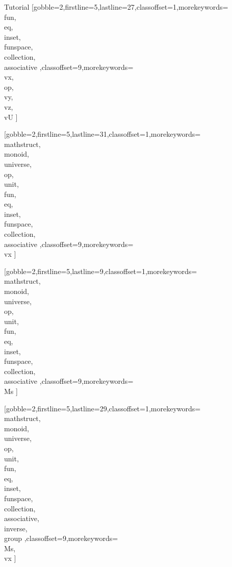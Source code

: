 \documentclass[lang={en,de}]{stex}
\begin{document}
\begin{sfragment}{Tutorial}
    [gobble=2,firstline=5,lastline=27,classoffset=1,morekeywords={
    \\fun,\\eq,\\inset,
    \\funspace,\\collection,\\associative
    },classoffset=9,morekeywords={
      \\vx,\\op,\\vy,\\vz,\\vU
    }]

    [gobble=2,firstline=5,lastline=31,classoffset=1,morekeywords={
    \\mathstruct,\\monoid,\\universe,\\op,\\unit,\\fun,\\eq,\\inset,
    \\funspace,\\collection,\\associative
    },classoffset=9,morekeywords={
      \\vx
    }]

    [gobble=2,firstline=5,lastline=9,classoffset=1,morekeywords={
    \\mathstruct,\\monoid,\\universe,\\op,\\unit,\\fun,\\eq,\\inset,
    \\funspace,\\collection,\\associative
    },classoffset=9,morekeywords={
      \\Ms
    }]

    [gobble=2,firstline=5,lastline=29,classoffset=1,morekeywords={
    \\mathstruct,\\monoid,\\universe,\\op,\\unit,\\fun,\\eq,\\inset,
    \\funspace,\\collection,\\associative,\\inverse,\\group
    },classoffset=9,morekeywords={
      \\Ms,\\vx
    }]


\end{sfragment}
\end{document}
